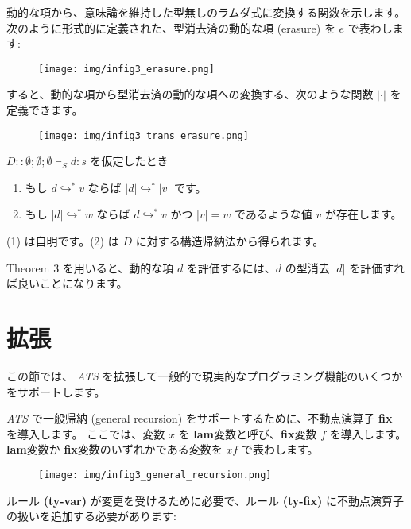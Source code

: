 \documentclass[submit,techreq,noauthor,onecolumn]{ipsj}
\begin{document}
動的な項から、意味論を維持した型無しのラムダ式に変換する関数を示します。
次のように形式的に定義された、型消去済の動的な項 (erasure) を $e$ で表わします:

\begin{figure}[h]
\centering
\texttt{[image: img/infig3\_erasure.png]}
\end{figure}

\noindent すると、動的な項から型消去済の動的な項への変換する、次のような関数 $|\cdot|$ を定義できます。

\begin{figure}[h]
\centering
\texttt{[image: img/infig3\_trans\_erasure.png]}
\end{figure}

$D :: \emptyset; \emptyset; \emptyset \vdash_S d : s$ を仮定したとき

\begin{enumerate}
  \item もし $d \hookrightarrow^* v$ ならば $|d| \hookrightarrow^* |v|$ です。
  \item もし $|d| \hookrightarrow^* w$ ならば $d \hookrightarrow^* v$ かつ $|v| = w$ であるような値 $v$ が存在します。
\end{enumerate}

(1) は自明です。(2) は $D$ に対する構造帰納法から得られます。

\noindent Theorem 3 を用いると、動的な項 $d$ を評価するには、$d$ の型消去 $|d|$ を評価すれば良いことになります。

\section{拡張}

この節では、 {\it ATS} を拡張して一般的で現実的なプログラミング機能のいくつかをサポートします。

{\it ATS} で一般帰納 (general recursion) をサポートするために、不動点演算子 {\bf fix} を導入します。
ここでは、変数 $x$ を {\bf lam}変数と呼び、{\bf fix}変数 $f$ を導入します。
 {\bf lam}変数か {\bf fix}変数のいずれかである変数を $xf$ で表わします。

\begin{figure}[h]
\centering
\texttt{[image: img/infig3\_general\_recursion.png]}
\end{figure}

ルール {\bf (ty-var)} が変更を受けるために必要で、ルール {\bf (ty-fix)} に不動点演算子の扱いを追加する必要があります:
\end{document}
